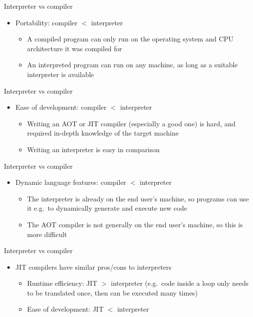 \begin{frame}{Interpreter vs compiler}
    \begin{itemize}
        \item Portability: compiler $<$ interpreter \pause
        \begin{itemize}
            \item A compiled program can only run on the operating system and CPU architecture it was compiled for \pause
            \item An interpreted program can run on any machine, as long as a suitable interpreter is available
        \end{itemize}
    \end{itemize}
\end{frame}

\begin{frame}{Interpreter vs compiler}
    \begin{itemize}
        \item Ease of development: compiler $<$ interpreter \pause
        \begin{itemize}
            \item Writing an AOT or JIT compiler (especially a good one) is hard, and required in-depth knowledge of the target machine \pause
            \item Writing an interpreter is easy in comparison
        \end{itemize}
    \end{itemize}
\end{frame}

\begin{frame}{Interpreter vs compiler}
    \begin{itemize}
        \item Dynamic language features: compiler $<$ interpreter \pause
        \begin{itemize}
            \item The interpreter is already on the end user's machine, so programs can use it e.g.\ to dynamically generate and execute new code \pause
            \item The AOT compiler is not generally on the end user's machine, so this is more difficult
        \end{itemize}
    \end{itemize}
\end{frame}

\begin{frame}{Interpreter vs compiler}
    \begin{itemize}
        \pause\item JIT compilers have similar pros/cons to interpreters
					\begin{itemize}
						\pause\item Runtime efficiency: JIT $>$ interpreter (e.g.\ code inside a loop only needs to be translated once, then can be executed many times)
						\pause\item Ease of development: JIT $<$ interpreter
					\end{itemize}
    \end{itemize}
\end{frame}

